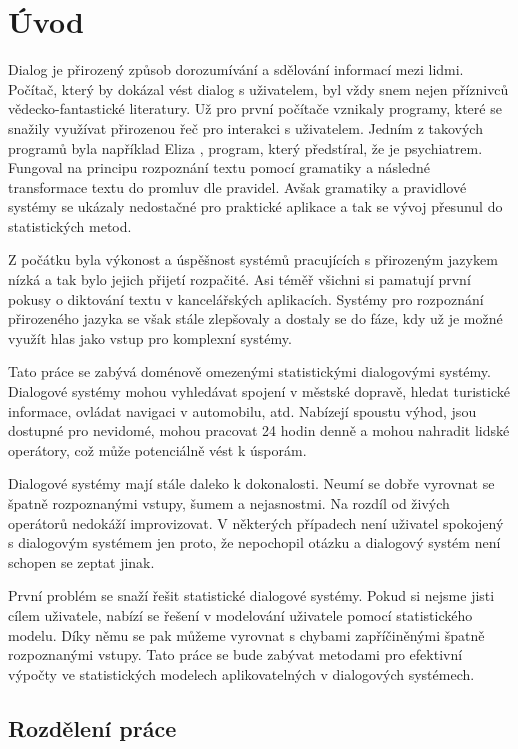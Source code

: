 \chapter*{Úvod}

Dialog je přirozený způsob dorozumívání a sdělování informací mezi lidmi.
Počítač, který by dokázal vést dialog s uživatelem, byl vždy snem nejen příznivců vědecko-fantastické literatury.
Už pro první počítače vznikaly programy, které se snažily využívat přirozenou řeč pro interakci s uživatelem.
Jedním z takových programů byla například Eliza \cite{weizenbaum1966eliza}, program, který předstíral, že je psychiatrem.
Fungoval na principu rozpoznání textu pomocí gramatiky a následné transformace textu do promluv dle pravidel.
Avšak gramatiky a pravidlové systémy se ukázaly nedostačné pro praktické aplikace a tak se vývoj přesunul do statistických metod.

Z počátku byla výkonost a úspěšnost systémů pracujících s přirozeným jazykem nízká a tak bylo jejich přijetí rozpačité.
Asi téměř všichni si pamatují první pokusy o diktování textu v kancelářských aplikacích.
Systémy pro rozpoznání přirozeného jazyka se však stále zlepšovaly a dostaly se do fáze, kdy už je možné využít hlas jako vstup pro komplexní systémy.

Tato práce se zabývá doménově omezenými statistickými dialogovými systémy.
Dialogové systémy mohou vyhledávat spojení v městské dopravě, hledat turistické informace, ovládat navigaci v automobilu, atd.
Nabízejí spoustu výhod, jsou dostupné pro nevidomé, mohou pracovat 24 hodin denně a mohou nahradit lidské operátory, což může potenciálně vést k úsporám.

Dialogové systémy mají stále daleko k dokonalosti.
Neumí se dobře vyrovnat se špatně rozpoznanými vstupy, šumem a nejasnostmi.
Na rozdíl od živých operátorů nedokáží improvizovat.
V některých případech není uživatel spokojený s dialogovým systémem jen proto, že nepochopil otázku a dialogový systém není schopen se zeptat jinak.

První problém se snaží řešit statistické dialogové systémy.
Pokud si nejsme jisti cílem uživatele, nabízí se řešení v modelování uživatele pomocí statistického modelu.
Díky němu se pak můžeme vyrovnat s chybami zapříčiněnými špatně rozpoznanými vstupy.
Tato práce se bude zabývat metodami pro efektivní výpočty ve statistických modelech aplikovatelných v dialogových systémech.

\section*{Rozdělení práce}

